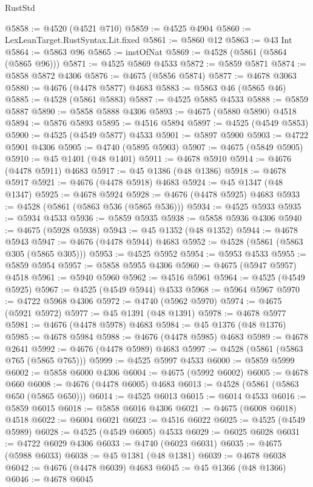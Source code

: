 \begin{lexlean}{RustStd}
\begin{coremodule}
{\begin{coremodule}
{{{{{{{{{{{{{{{{{{{{{{{{{{{{{{{{{{{{{{{{{{{{{{{{{{{{{{{{{{{{@5858 := @4520 (@4521 @710)
@5859 := @4525 @4904
@5860 := LexLeanTarget.RustSyntax.Lit.fixed
@5861 := @5860 @12
@5863 := @43 Int
@5864 := @5863 @96
@5865 := instOfNat
@5869 := @4528 (@5861 (@5864 (@5865 @96)))
@5871 := @4525 @5869 @4533
@5872 := @5859 @5871
@5874 := @5858 @5872 @4306
@5876 := @4675 (@5856 @5874)
@5877 := @4678 @3063
@5880 := @4676 (@4478 @5877) @4683
@5883 := @5863 @46 (@5865 @46)
@5885 := @4528 (@5861 @5883)
@5887 := @4525 @5885 @4533
@5888 := @5859 @5887
@5890 := @5858 @5888 @4306
@5893 := @4675 (@5880 @5890) @4518
@5894 := @5876 @5893
@5895 := @4516 @5894
@5897 := @4525 (@4549 @5853)
@5900 := @4525 (@4549 @5877) @4533
@5901 := @5897 @5900
@5903 := @4722 @5901 @4306
@5905 := @4740 (@5895 @5903)
@5907 := @4675 (@5849 @5905)
@5910 := @45 @1401 (@48 @1401)
@5911 := @4678 @5910
@5914 := @4676 (@4478 @5911) @4683
@5917 := @45 @1386 (@48 @1386)
@5918 := @4678 @5917
@5921 := @4676 (@4478 @5918) @4683
@5924 := @45 @1347 (@48 @1347)
@5925 := @4678 @5924
@5928 := @4676 (@4478 @5925) @4683
@5933 := @4528 (@5861 (@5863 @536 (@5865 @536)))
@5934 := @4525 @5933
@5935 := @5934 @4533
@5936 := @5859 @5935
@5938 := @5858 @5936 @4306
@5940 := @4675 (@5928 @5938)
@5943 := @45 @1352 (@48 @1352)
@5944 := @4678 @5943
@5947 := @4676 (@4478 @5944) @4683
@5952 := @4528 (@5861 (@5863 @305 (@5865 @305)))
@5953 := @4525 @5952
@5954 := @5953 @4533
@5955 := @5859 @5954
@5957 := @5858 @5955 @4306
@5960 := @4675 (@5947 @5957) @4518
@5961 := @5940 @5960
@5962 := @4516 @5961
@5964 := @4525 (@4549 @5925)
@5967 := @4525 (@4549 @5944) @4533
@5968 := @5964 @5967
@5970 := @4722 @5968 @4306
@5972 := @4740 (@5962 @5970)
@5974 := @4675 (@5921 @5972)
@5977 := @45 @1391 (@48 @1391)
@5978 := @4678 @5977
@5981 := @4676 (@4478 @5978) @4683
@5984 := @45 @1376 (@48 @1376)
@5985 := @4678 @5984
@5988 := @4676 (@4478 @5985) @4683
@5989 := @4678 @2641
@5992 := @4676 (@4478 @5989) @4683
@5997 := @4528 (@5861 (@5863 @765 (@5865 @765)))
@5999 := @4525 @5997 @4533
@6000 := @5859 @5999
@6002 := @5858 @6000 @4306
@6004 := @4675 (@5992 @6002)
@6005 := @4678 @660
@6008 := @4676 (@4478 @6005) @4683
@6013 := @4528 (@5861 (@5863 @650 (@5865 @650)))
@6014 := @4525 @6013
@6015 := @6014 @4533
@6016 := @5859 @6015
@6018 := @5858 @6016 @4306
@6021 := @4675 (@6008 @6018) @4518
@6022 := @6004 @6021
@6023 := @4516 @6022
@6025 := @4525 (@4549 @5989)
@6028 := @4525 (@4549 @6005) @4533
@6029 := @6025 @6028
@6031 := @4722 @6029 @4306
@6033 := @4740 (@6023 @6031)
@6035 := @4675 (@5988 @6033)
@6038 := @45 @1381 (@48 @1381)
@6039 := @4678 @6038
@6042 := @4676 (@4478 @6039) @4683
@6045 := @45 @1366 (@48 @1366)
@6046 := @4678 @6045
}}}}}}}}}}}}}}}}}}}}}}}}}}}}}}}}}}}}}}}}}}}}}}}}}}}}}}}}}}}}
\end{coremodule}}
\end{coremodule}
\end{lexlean}
